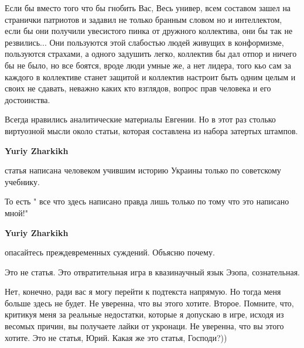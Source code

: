 \begin{itemize}

Если бы вместо того что бы гнобить Вас, Весь универ, всем составом зашел на
странички патриотов и задавил не только бранным словом но и интеллектом, если
бы они получили увесистого пинка от дружного коллектива, они бы так не
резвились... Они пользуются этой слабостью людей живущих в конформизме,
пользуются страхами, а одного задушить легко, коллектив бы дал отпор и ничего
бы не было, но все боятся, вроде люди умные же, а нет лидера, того кьо сам за
каждого в коллективе станет защитой и коллектив настроит быть одним целым и
своих не сдавать, неважно каких кто взглядов, вопрос прав человека и его
достоинства.


Всегда нравились аналитические материалы Евгении. Но в этот раз столько
виртуозной мысли около статьи, которая составлена из набора затертых штампов.

\begin{itemize}

 
\textbf{Yuriy Zharkikh} 

статья написана человеком учившим историю Украины только по советскому учебнику.

То есть " все что здесь написано правда лишь только по тому что это написано мной!"

 
\textbf{Yuriy Zharkikh} 

опасайтесь преждевременных суждений. Объясню почему.

Это не статья. Это отвратительная игра в квазинаучный язык Эзопа, сознательная.

Нет, конечно, ради вас я могу перейти к подтекста напрямую. Но тогда меня
больше здесь не будет. Не уверенна, что вы этого хотите. Второе. Помните, что,
критикуя меня за реальные недостатки, которые я допускаю в игре, исходя из
весомых причин, вы получаете лайки от укронаци. Не уверенна, что вы этого
хотите. Это не статья, Юрий. Какая же это статья, Господи?))



\end{itemize}
\end{itemize}
